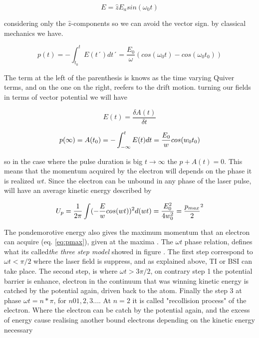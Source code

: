 \begin{equation}
E=\widehat{z}E_{a}sin(\omega_{0} t) 
\end{equation}

considering only the $\widehat{z}$-components so we can avoid the vector sign. by classical mechanics we have.

\begin{equation}
p(t)=-\int_{t_{0}}^{t} E(t´)dt´ = \dfrac{E_{0}}{\omega} (cos(\omega_{0} t)- cos(\omega_{0} t_{0}))
\end{equation}

The term at the left of the parenthesis is knows as the time varying Quiver terms, and on the one on the right, reefers to the drift motion. 
turning our fields in terms of vector potential we will have

\begin{equation}
E(t) = \dfrac{\delta A(t)}{\delta t}
\end{equation}

\begin{equation}
p(\infty) = A(t_{0}) = -\int_{-\infty}^{t} E(t) dt = \dfrac{E_{0}}{w} cos(w_{0}t_{0})
$\label{eq:pmax}$
\end{equation}

so in the case where the pulse  duration is big $t \longrightarrow \infty$ the $p + A(t) = 0$. This means that the momentum acquired by the electron will depends on the phase it is realized $wt$. Since the electron can be unbound in any phase of the laser pulse, will have an average kinetic energy described by

\begin{equation} 
U_{p} = \dfrac{1}{2\pi} \int (-\dfrac{E}{w} cos (wt))^{2}d(wt) = \dfrac{E^{2}_{0}}{4w^{2}_{0}} = \dfrac{p_{max}}{2}^{2}
$\label{eq:pondeenergy}$
\end{equation}

The pondemorotive energy also gives the maximum momentum that an electron can acquire (eq. \ref{eq:pmax}), given at the maxima . The $\omega t$ phase relation, defines what its called\textit{the three step model} showed in figure . The first step correspond to $\omega t < \pi /2$ where the laser field is suppress, and as explained above, TI or BSI can take place. The second step, is where $\omega t > 3\pi /2$, on contrary step 1 the potential barrier is enhance, electron in the continuum that was winning kinetic energy is catched by the potential again, driven  back to the atom. Finally the step 3 at  phase  $\omega t = n* \pi$, for $n 0 1,2,3...$. At $n=2$ it is called "recollision process" of the electron. Where the electron can be catch by the potential again, and the excess of energy cause realising another bound electrons depending on the kinetic energy necessary \cite{krishnan_ignition_2012}

